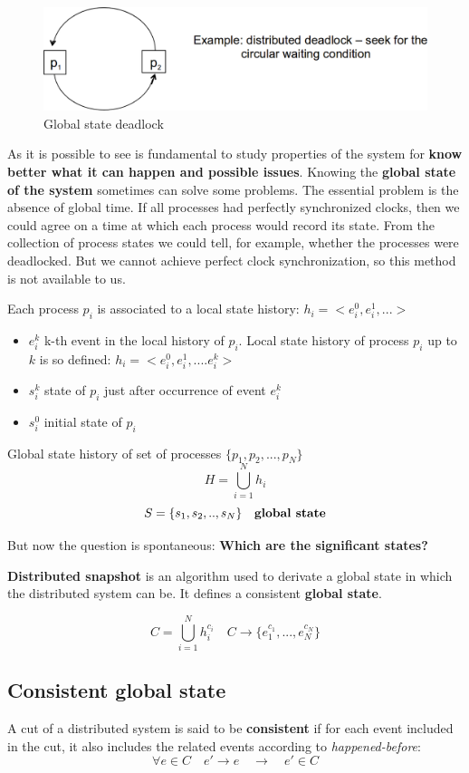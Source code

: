 \begin{figure}[!h]
    \centering
    \includegraphics[width=.60\linewidth]{images/Clock/deadlockGlobalProp.png}
    \caption{Global state deadlock}
\end{figure}

As it is possible to see is fundamental to study properties of the system for \textbf{know better what it can happen and possible issues}. Knowing the \textbf{global state of the system} sometimes can solve some problems.
The essential problem is the absence of global time. If all processes had perfectly synchronized clocks, then we could agree on a time at which each process would record its state. From the collection of process states we could tell, for example, whether the processes were deadlocked. But we cannot achieve perfect clock synchronization, so this method is not available to us.

Each process \(p_i\) is associated to a local state history: \(h_i = <e_i^0, e_i^1,...>\)
\begin{itemize}
    \item \(e_i^k\) k-th event in the local history of \(p_i\). Local state history of process \(p_i\) up to \(k\) is so defined:  \(h_i = <e_i^0, e_i^1,.... e_i^k>\)
    \item \(s_i^k\) state of \(p_i\) just after occurrence of event \(e_i^k\)
    \item \(s_i^0\) initial state of \(p_i\)
\end{itemize}

Global state history of set of processes \(\{p_1,p_2,...,p_N\}\)
\[H = \bigcup_{i=1}^{N}h_i\]
\[S = \{s_1,s_2,..,s_N\} \quad \textrm{\textbf{global state}}\]

But now the question is spontaneous: \textbf{Which are the significant states?}

\textbf{Distributed snapshot} is an algorithm used to derivate a global state in which the distributed system can be. It defines a consistent \textbf{global state}.

\[C = \bigcup_{i=1}^{N}h_i^{c_i} \quad C \rightarrow \{e_1^{c_1},...,e_N^{c_N}\}\]

\subsection{Consistent global state}
A cut of a distributed system is said to be \textbf{consistent} if for each event included in the cut, it also includes the related events according to \textit{happened-before}:
\[\forall e \in C \quad e' \rightarrow e \quad \rightarrow \quad e' \in C\]


